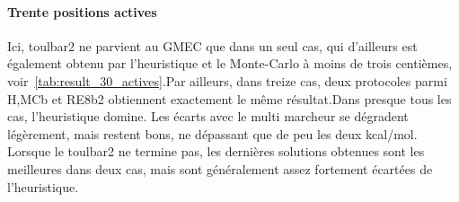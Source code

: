    \paragraph{Trente positions actives}
Ici, toulbar2 ne parvient au GMEC que dans un seul cas, qui d'ailleurs est également obtenu par l'heuristique et le Monte-Carlo à moins de trois centièmes, voir~\ref{tab:result_30_actives}.Par ailleurs, dans treize cas, deux protocoles parmi H,MCb et RE8b2 obtiennent exactement le même résultat.Dans presque tous les cas, l'heuristique domine. Les écarts avec le multi marcheur se dégradent légèrement, mais restent bons, ne dépassant que de peu les deux kcal/mol. Lorsque le toulbar2 ne termine pas, les  dernières solutions obtenues sont les meilleures dans deux cas, mais sont généralement assez fortement écartées de l'heuristique.     


